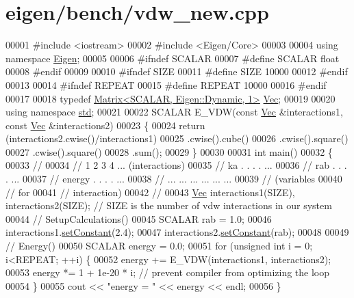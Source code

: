 \hypertarget{eigen_2bench_2vdw__new_8cpp_source}{}\section{eigen/bench/vdw\+\_\+new.cpp}
\label{eigen_2bench_2vdw__new_8cpp_source}

\begin{DoxyCode}
00001 \textcolor{preprocessor}{#include <iostream>}
00002 \textcolor{preprocessor}{#include <Eigen/Core>}
00003 
00004 \textcolor{keyword}{using namespace }\hyperlink{namespace_eigen}{Eigen};
00005 
00006 \textcolor{preprocessor}{#ifndef SCALAR}
00007 \textcolor{preprocessor}{#define SCALAR float}
00008 \textcolor{preprocessor}{#endif}
00009 
00010 \textcolor{preprocessor}{#ifndef SIZE}
00011 \textcolor{preprocessor}{#define SIZE 10000}
00012 \textcolor{preprocessor}{#endif}
00013 
00014 \textcolor{preprocessor}{#ifndef REPEAT}
00015 \textcolor{preprocessor}{#define REPEAT 10000}
00016 \textcolor{preprocessor}{#endif}
00017 
00018 \textcolor{keyword}{typedef} \hyperlink{group___core___module_class_eigen_1_1_matrix}{Matrix<SCALAR, Eigen::Dynamic, 1>} \hyperlink{group___core___module_class_eigen_1_1_matrix}{Vec};
00019 
00020 \textcolor{keyword}{using namespace }\hyperlink{namespacestd}{std};
00021 
00022 SCALAR E\_VDW(\textcolor{keyword}{const} \hyperlink{group___core___module_class_eigen_1_1_matrix}{Vec} &interactions1, \textcolor{keyword}{const} \hyperlink{group___core___module_class_eigen_1_1_matrix}{Vec} &interactions2)
00023 \{
00024   \textcolor{keywordflow}{return} (interactions2.cwise()/interactions1)
00025          .cwise().cube()
00026          .cwise().square()
00027          .cwise().square()
00028          .sum();
00029 \}
00030 
00031 \textcolor{keywordtype}{int} main() 
00032 \{
00033   \textcolor{comment}{//}
00034   \textcolor{comment}{//          1   2   3   4  ... (interactions)}
00035   \textcolor{comment}{// ka       .   .   .   .  ...}
00036   \textcolor{comment}{// rab      .   .   .   .  ...}
00037   \textcolor{comment}{// energy   .   .   .   .  ...}
00038   \textcolor{comment}{// ...     ... ... ... ... ...}
00039   \textcolor{comment}{// (variables}
00040   \textcolor{comment}{//    for}
00041   \textcolor{comment}{// interaction)}
00042   \textcolor{comment}{//}
00043   \hyperlink{group___core___module_class_eigen_1_1_matrix}{Vec} interactions1(SIZE), interactions2(SIZE); \textcolor{comment}{// SIZE is the number of vdw interactions in our system}
00044   \textcolor{comment}{// SetupCalculations()}
00045   SCALAR rab = 1.0;  
00046   interactions1.\hyperlink{class_eigen_1_1_plain_object_base_ac8dea1df3d92b752cc683ff42abf6f9b}{setConstant}(2.4);
00047   interactions2.\hyperlink{class_eigen_1_1_plain_object_base_ac8dea1df3d92b752cc683ff42abf6f9b}{setConstant}(rab);
00048   
00049   \textcolor{comment}{// Energy()}
00050   SCALAR energy = 0.0;
00051   \textcolor{keywordflow}{for} (\textcolor{keywordtype}{unsigned} \textcolor{keywordtype}{int} i = 0; i<REPEAT; ++i) \{
00052     energy += E\_VDW(interactions1, interactions2);
00053     energy *= 1 + 1e-20 * i; \textcolor{comment}{// prevent compiler from optimizing the loop}
00054   \}
00055   cout << \textcolor{stringliteral}{"energy = "} << energy << endl;
00056 \}
\end{DoxyCode}
